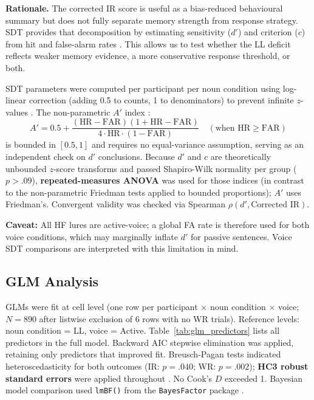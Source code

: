 \documentclass[12pt, a4paper]{article}
\begin{document}
\textbf{Rationale.} The corrected IR score is useful as a bias-reduced
behavioural summary but does not fully separate memory strength from
response strategy. SDT provides that decomposition by estimating
sensitivity ($d'$) and criterion ($c$) from hit and false-alarm rates
\citep{stanislaw1999,macmillan2005}. This allows us to test whether the
LL deficit reflects weaker memory evidence, a more conservative response
threshold, or both.

SDT parameters were computed per participant per noun condition using
log-linear correction (adding 0.5 to counts, 1 to denominators) to
prevent infinite $z$-values \citep{macmillan2005}. The non-parametric
$A'$ index \citep{snodgrass1988}:
\[
  A' = 0.5 + \frac{(\text{HR} - \text{FAR})(1 + \text{HR} - \text{FAR})}
                   {4 \cdot \text{HR} \cdot (1 - \text{FAR})}
  \quad (\text{when HR} \geq \text{FAR})
\]
is bounded in $[0.5,1]$ and requires no equal-variance assumption,
serving as an independent check on $d'$ conclusions. Because $d'$ and $c$
are theoretically unbounded $z$-score transforms and passed Shapiro-Wilk
normality per group ($p > .09$), \textbf{repeated-measures ANOVA} was
used for those indices (in contrast to the non-parametric Friedman tests
applied to bounded proportions); $A'$ uses Friedman's. Convergent
validity was checked via Spearman $\rho(d', \text{Corrected IR})$.

\textbf{Caveat:} All HF lures are active-voice; a global FA rate is
therefore used for both voice conditions, which may marginally inflate
$d'$ for passive sentences. Voice SDT comparisons are interpreted with
this limitation in mind.

\subsection{GLM Analysis}

GLMs were fit at cell level (one row per participant $\times$ noun
condition $\times$ voice; $N = 890$ after listwise exclusion of 6 rows
with no WR trials). Reference levels: noun condition = LL, voice =
Active. Table~\ref{tab:glm_predictors} lists all predictors in the full
model. Backward AIC stepwise elimination was applied, retaining only
predictors that improved fit. Breusch-Pagan tests indicated
heteroscedasticity for both outcomes (IR: $p = .040$; WR: $p = .002$);
\textbf{HC3 robust standard errors} were applied throughout
\citep{macmillan2005}. No Cook's $D$ exceeded 1. Bayesian model
comparison used \texttt{lmBF()} from the \texttt{BayesFactor} package
\citep{morey2022}.
\end{document}
